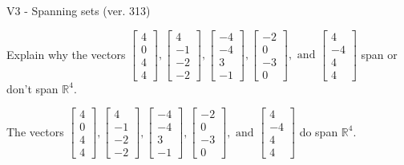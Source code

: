 \begin{exercise}
  \begin{exerciseTitle}V3 - Spanning sets (ver. 313)\end{exerciseTitle}
  \begin{exerciseStatement}
    Explain why the vectors \(\left[\begin{array}{r}
4 \\
0 \\
4 \\
4
\end{array}\right] , \left[\begin{array}{r}
4 \\
-1 \\
-2 \\
-2
\end{array}\right] , \left[\begin{array}{r}
-4 \\
-4 \\
3 \\
-1
\end{array}\right] , \left[\begin{array}{r}
-2 \\
0 \\
-3 \\
0
\end{array}\right] , \text{ and } \left[\begin{array}{r}
4 \\
-4 \\
4 \\
4
\end{array}\right]\) span or don't span \(\mathbb{R}^4\). 
	


  \end{exerciseStatement}
  \begin{exerciseAnswer}
   The vectors \(\left[\begin{array}{r}
4 \\
0 \\
4 \\
4
\end{array}\right] , \left[\begin{array}{r}
4 \\
-1 \\
-2 \\
-2
\end{array}\right] , \left[\begin{array}{r}
-4 \\
-4 \\
3 \\
-1
\end{array}\right] , \left[\begin{array}{r}
-2 \\
0 \\
-3 \\
0
\end{array}\right] , \text{ and } \left[\begin{array}{r}
4 \\
-4 \\
4 \\
4
\end{array}\right]\) 
  	 do  
	span \(\mathbb{R}^4\).
  



\end{exerciseAnswer}
\end{exercise}
